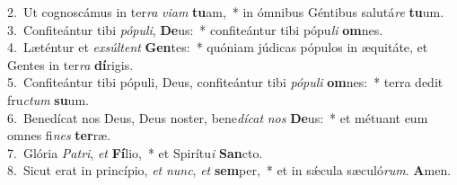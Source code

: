 {2.~}Ut cognoscámus in ter\textit{ra} \textit{vi}\textit{am} \textbf{tu}am,~* in ómnibus Géntibus salutá\textit{re} \textbf{tu}um.\\
{3.~}Confiteántur tibi \textit{pó}\textit{pu}\textit{li}, \textbf{De}us:~* confiteántur tibi pópu\textit{li} \textbf{om}nes.\\
{4.~}Læténtur et \textit{ex}\textit{súl}\textit{tent} \textbf{Gen}tes:~* quóniam júdicas pópulos in æquitáte, et Gentes in ter\textit{ra} \textbf{dí}rigis.\\
{5.~}Confiteántur tibi pópuli, Deus, confiteántur tibi \textit{pó}\textit{pu}\textit{li} \textbf{om}nes:~* terra dedit fru\textit{ctum} \textbf{su}um.\\
{6.~}Benedícat nos Deus, Deus noster, bene\textit{dí}\textit{cat} \textit{nos} \textbf{De}us:~* et métuant eum omnes fi\textit{nes} \textbf{ter}ræ.\\
{7.~}Glória \textit{Pa}\textit{tri}, \textit{et} \textbf{Fí}lio,~* et Spirítu\textit{i} \textbf{San}cto.\\
{8.~}Sicut erat in princípio, \textit{et} \textit{nunc}, \textit{et} \textbf{sem}per,~* et in sǽcula sæculó\textit{rum}. \textbf{A}men.\\
